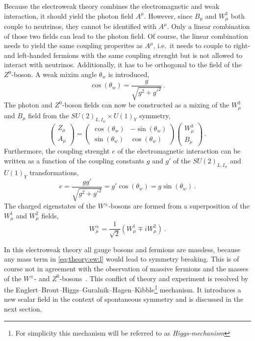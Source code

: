 Because the electroweak theory combines the electromagnetic and weak interaction, it should yield the photon field $A^\mu$.
However, since $B_\mu$ and $W_\mu^3$ both couple to neutrinos, they cannot be identified with $A^\mu$.
Only a linear combination of those two fields can lead to the photon field.
Of course, the linear combination needs to yield the same coupling properites as $A^\mu$, i.e.\ it needs to couple to
right- and left-handed fermions with the same coupling strenght but is not allowed to interact with neutrinos.
Additionally, it has to be orthogonal to the field of the $Z^0$-boson.
A weak mixim angle $\theta_w$ is introduced,
\begin{equation}
    \cos \left( \theta_w \right) = \frac{g}{\sqrt{g^2 + {g'}^2}} \,.
\end{equation}
The photon and $Z^0$-boson fields can now be constructed as a mixing of the $W_\mu^3$ and $B_\mu$ field from the
$SU{(2)}_{L,I_w} \times U{(1)}_Y$ symmetry,
\begin{equation}
    \label{eq:theory:ew:zafield}
    \begin{pmatrix}
        Z_\mu \\ A_\mu
    \end{pmatrix}
    =
    \begin{pmatrix}
        \cos \left(\theta_w\right) & -\sin \left(\theta_w\right) \\
        \sin \left(\theta_w\right) & \cos \left(\theta_w\right)
    \end{pmatrix}
    \begin{pmatrix}
        W_\mu^3 \\ B_\mu
    \end{pmatrix} \,.
\end{equation}
Furthermore, the coupling strenght $e$ of the electromagnetic interaction can be written as a function
of the coupling constants $g$ and $g'$ of the $SU{(2)}_{L,I_w}$ and $U{(1)}_Y$ transformations,
\begin{equation}
    e = \frac{g g'}{\sqrt{g^2 + {g'}^2}} = g' \cos \left(\theta_w\right) = g \sin \left(\theta_w\right) \,.
\end{equation}
The charged eigenstates of the $W^\pm$-bosons are formed from a superposition of the $W_\mu^1$ and $W_\mu^2$ fields,
\begin{equation}
    \label{eq:theory:ew:wfield}
    W^\pm_\mu = \frac{1}{\sqrt{2}} \left(W_\mu^1 \mp i W_\mu^2 \right) \,.
\end{equation}

In this electroweak theory all gauge bosons and fermions are massless, because any mass term in \cref{eq:theory:ew:l}
would lead to symmetry breaking.
This is of course not in agreement with the observation of massive fermions and the masses of the $W^\pm$- and $Z^0$-bosons~\cite{PDG}.
This conflict of theory and experiment is resolved by the Englert--Brout--Higgs--Guralnik--Hagen--Kibble\footnote{For simplicity this mechanism will be referred to as \emph{Higgs-mechanism}} mechanism.
It introduces a new scalar field in the context of spontaneous symmetry and is discussed in the next section.

